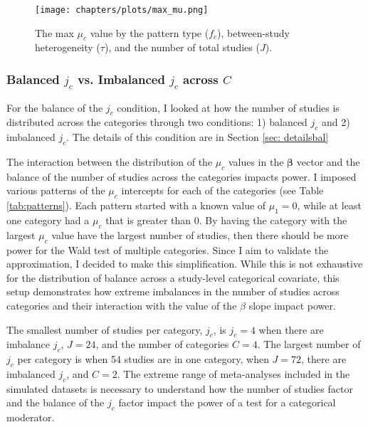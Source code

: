 \begin{figure}
    \centering
    \vspace{-5pt}\texttt{[image: chapters/plots/max\_mu.png]}\caption{The max $\mu_c$ value by the pattern type ($f_c$), between-study heterogeneity ($\tau$), and the number of total studies ($J$). \label{fig:max_mu}}
    \vspace{-5pt}
\end{figure}


\subsubsection{Balanced $j_c$ vs. Imbalanced $j_c$ across $C$} 

For the balance of the $j_c$ condition, I looked at how the number of studies is distributed across the categories through two conditions: 1) balanced $j_c$ and 2) imbalanced $j_c$. The details of this condition are in Section \ref{sec: detailsbal}

The interaction between the distribution of the $\mu_c$ values in the $\bm{\beta}$ vector and the balance of the number of studies across the categories impacts power. I imposed various patterns of the $\mu_c$ intercepts for each of the categories (see Table \ref{tab:patterns}). Each pattern started with a known value of $\mu_1 = 0$, while at least one category had a $\mu_c$ that is greater than 0. By having the category with the largest $\mu_c$ value have the largest number of studies, then there should be more power for the Wald test of multiple categories. Since I aim to validate the approximation, I decided to make this simplification. While this is not exhaustive for the distribution of balance across a study-level categorical covariate, this setup demonstrates how extreme imbalances in the number of studies across categories and their interaction with the value of the $\beta$ slope impact power. 

The smallest number of studies per category, $j_c$, is $j_c = 4$ when there are imbalance $j_c$, $J = 24$, and the number of categories $C = 4$. The largest number of $j_c$ per category is when 54 studies are in one category, when $J= 72$, there are imbalanced $j_c$, and $C=2$. The extreme range of meta-analyses included in the simulated datasets is necessary to understand how the number of studies factor and the balance of the $j_c$ factor impact the power of a test for a categorical moderator. 



